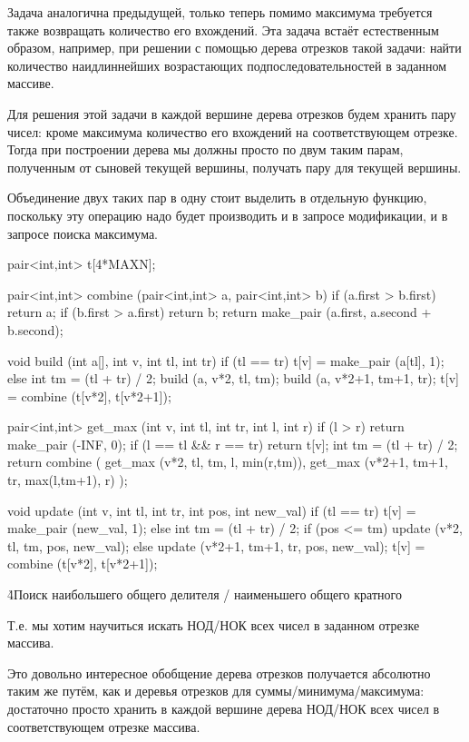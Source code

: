 Задача аналогична предыдущей, только теперь помимо максимума требуется также возвращать количество его вхождений. Эта задача встаёт естественным образом, например, при решении с помощью дерева отрезков такой задачи: найти количество наидлиннейших возрастающих подпоследовательностей в заданном массиве.

Для решения этой задачи в каждой вершине дерева отрезков будем хранить пару чисел: кроме максимума количество его вхождений на соответствующем отрезке. Тогда при построении дерева мы должны просто по двум таким парам, полученным от сыновей текущей вершины, получать пару для текущей вершины.

Объединение двух таких пар в одну стоит выделить в отдельную функцию, поскольку эту операцию надо будет производить и в запросе модификации, и в запросе поиска максимума.

\code
pair<int,int> t[4*MAXN];

pair<int,int> combine (pair<int,int> a, pair<int,int> b) {
	if (a.first > b.first)
		return a;
	if (b.first > a.first)
		return b;
	return make_pair (a.first, a.second + b.second);
}

void build (int a[], int v, int tl, int tr) {
	if (tl == tr)
		t[v] = make_pair (a[tl], 1);
	else {
		int tm = (tl + tr) / 2;
		build (a, v*2, tl, tm);
		build (a, v*2+1, tm+1, tr);
		t[v] = combine (t[v*2], t[v*2+1]);
	}
}

pair<int,int> get_max (int v, int tl, int tr, int l, int r) {
	if (l > r)
		return make_pair (-INF, 0);
	if (l == tl && r == tr)
		return t[v];
	int tm = (tl + tr) / 2;
	return combine (
		get_max (v*2, tl, tm, l, min(r,tm)),
		get_max (v*2+1, tm+1, tr, max(l,tm+1), r)
	);
}

void update (int v, int tl, int tr, int pos, int new_val) {
	if (tl == tr)
		t[v] = make_pair (new_val, 1);
	else {
		int tm = (tl + tr) / 2;
		if (pos <= tm)
			update (v*2, tl, tm, pos, new_val);
		else
			update (v*2+1, tm+1, tr, pos, new_val);
		t[v] = combine (t[v*2], t[v*2+1]);
	}
}
\endcode

\h4{Поиск наибольшего общего делителя / наименьшего общего кратного}

Т.е. мы хотим научиться искать НОД/НОК всех чисел в заданном отрезке массива.

Это довольно интересное обобщение дерева отрезков получается абсолютно таким же путём, как и деревья отрезков для суммы/минимума/максимума: достаточно просто хранить в каждой вершине дерева НОД/НОК всех чисел в соответствующем отрезке массива.


